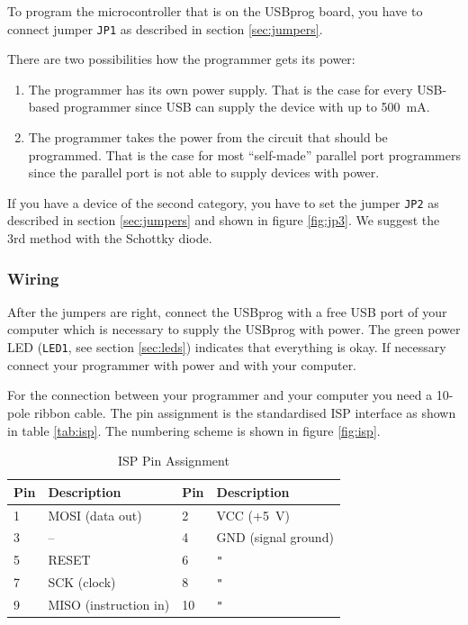 \documentclass[bibtotoc,UKenglish,halfparskip,oneside,DIV12]{scrreprt}
\begin{document}
To program the microcontroller that is on the USBprog board, you have to connect jumper
\texttt{JP1} as described in section \vref{sec:jumpers}.

There are two possibilities how the programmer gets its power:

\begin{enumerate}
  \item The programmer has its own power supply. That is the case for every USB-based programmer
    since USB can supply the device with up to 500~mA.
  \item The programmer takes the power from the circuit that should be programmed. That is the case
    for most ``self-made'' parallel port programmers since the parallel port is not able to supply
    devices with power.
\end{enumerate}

If you have a device of the second category, you have to set the jumper \texttt{JP2} as described in
section \vref{sec:jumpers} and shown in figure \vref{fig:jp3}. We suggest the 3rd method with the
Schottky diode.

\subsubsection{Wiring}

After the jumpers are right, connect the USBprog with a free USB port of your computer which is
necessary to supply the USBprog with power. The green power LED (\texttt{LED1}, see section
\vref{sec:leds}) indicates that everything is okay. If necessary connect your programmer with power
and with your computer.

For the connection between your programmer and your computer you need a 10-pole ribbon cable. The
pin assignment is the standardised ISP interface as shown in table \vref{tab:isp}. The numbering
scheme is shown in figure \vref{fig:isp}.

\begin{table}[h]
  \centering
  \begin{tabular}{|p{1cm}p{5cm}|p{1cm}p{5cm}|}
    \hline
    \textbf{Pin} & \textbf{Description} & \textbf{Pin} & \textbf{Description} \\
    \hline
    \hline
    1            & MOSI (data out)       & 2            & VCC (+5~V)           \\
    3            & --                    & 4            & GND (signal ground)  \\
    5            & RESET                 & 6            & \verb+"+             \\
    7            & SCK (clock)           & 8            & \verb+"+             \\
    9            & MISO (instruction in) & 10           & \verb+"+             \\
    \hline
  \end{tabular}
  \caption{ISP Pin Assignment}
  \label{tab:isp}
\end{table}
\end{document}
